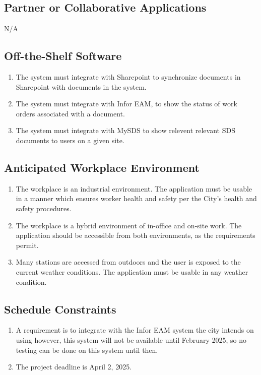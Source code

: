 \documentclass[12pt]{article}
\begin{document}
\subsection{Partner or Collaborative Applications}
N/A
\subsection{Off-the-Shelf Software}
\begin{enumerate} [{C-OTS}1.]
  \item The system must integrate with Sharepoint to synchronize documents in
    Sharepoint with documents in the system.
  \item The system must integrate with Infor EAM, to show the status of work
    orders associated with a document.
  \item The system must integrate with MySDS to show relevent relevant SDS
    documents to users on a given site.
\end{enumerate}

\subsection{Anticipated Workplace Environment}
\begin{enumerate} [{C-AWE}1.]
  \item The workplace is an industrial environment. The application must
    be usable in a manner which ensures worker health and safety per the
    City's health and safety procedures.
  \item The workplace is a hybrid environment of in-office and on-site
    work. The application should be accessible from both environments, as
    the requirements permit.
  \item Many stations are accessed from outdoors and the user is exposed to
    the current weather conditions. The application must be usable in any
    weather condition.
\end{enumerate}

\subsection{Schedule Constraints}
\begin{enumerate} [{C-SCH}1.]
  \item A requirement is to integrate with the Infor EAM system the city intends
    on using however, this system will not be available until
    February 2025, so no testing can be done on this system until then.

  \item The project deadline is April 2, 2025.
\end{enumerate}
\end{document}
